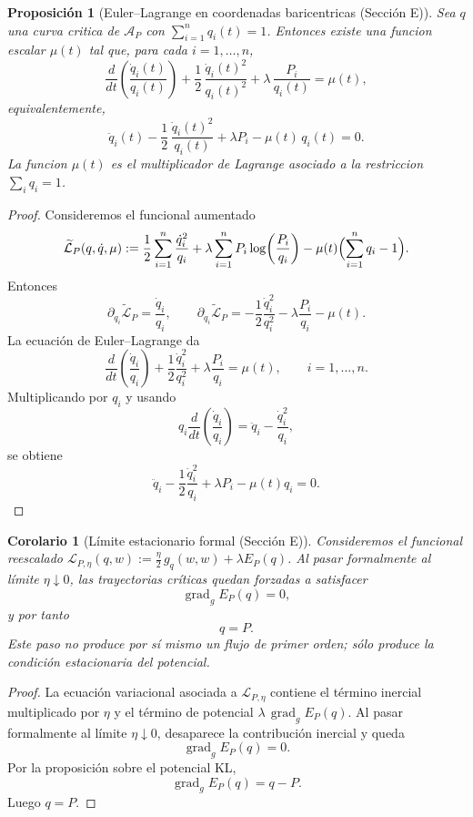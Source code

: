 ﻿\documentclass[12pt]{article}
\newcommand{\fuente}[1]{\textnormal{(#1)}}
\newtheorem{proposicion}{Proposición}[section]
\newtheorem{corolario}{Corolario}[section]
\begin{document}
\begin{proposicion}[Euler--Lagrange en coordenadas baricentricas \fuente{Sección E}]
Sea \(q\) una curva critica de \(\mathcal A_P\) con \(\sum_{i=1}^n q_i(t)=1\). Entonces existe una funcion escalar \(\mu(t)\) tal que, para cada \(i=1,\dots,n\),
\[
\frac{d}{dt}\left(\frac{\dot q_i(t)}{q_i(t)}\right)+\frac12\,\frac{\dot q_i(t)^2}{q_i(t)^2}+\lambda\,\frac{P_i}{q_i(t)}=\mu(t),
\]
equivalentemente,
\[
\ddot q_i(t)-\frac12\,\frac{\dot q_i(t)^2}{q_i(t)}+\lambda P_i-\mu(t)\,q_i(t)=0.
\]
La funcion \(\mu(t)\) es el multiplicador de Lagrange asociado a la restriccion \(\sum_i q_i=1\).
\end{proposicion}
\begin{proof}
Consideremos el funcional aumentado
\[
\widetilde{\mathcal L}_P(q,\dot q,\mu)
:=\frac12\sum_{i=1}^n\frac{\dot q_i^2}{q_i}
+\lambda\sum_{i=1}^n P_i\log\!\left(\frac{P_i}{q_i}\right)
-\mu(t)\Bigl(\sum_{i=1}^n q_i-1\Bigr).
\]
Entonces
\[
\partial_{\dot q_i}\widetilde{\mathcal L}_P=\frac{\dot q_i}{q_i},
\qquad
\partial_{q_i}\widetilde{\mathcal L}_P
=-\frac12\frac{\dot q_i^2}{q_i^2}-\lambda\frac{P_i}{q_i}-\mu(t).
\]
La ecuación de Euler--Lagrange da
\[
\frac{d}{dt}\left(\frac{\dot q_i}{q_i}\right)
+\frac12\frac{\dot q_i^2}{q_i^2}
+\lambda\frac{P_i}{q_i}
=\mu(t),
\qquad i=1,\dots,n.
\]
Multiplicando por \(q_i\) y usando
\[
q_i\frac{d}{dt}\left(\frac{\dot q_i}{q_i}\right)=\ddot q_i-\frac{\dot q_i^2}{q_i},
\]
se obtiene
\[
\ddot q_i-\frac12\frac{\dot q_i^2}{q_i}+\lambda P_i-\mu(t)q_i=0.
\]
\end{proof}

\begin{corolario}[Límite estacionario formal \fuente{Sección E}]
Consideremos el funcional reescalado \(\mathcal L_{P,\eta}(q,w):=\frac{\eta}{2}\,g_q(w,w)+\lambda E_P(q)\). Al pasar formalmente al límite \(\eta\downarrow 0\), las trayectorias críticas quedan forzadas a satisfacer
\[
\operatorname{grad}_g E_P(q)=0,
\]
y por tanto
\[
q=P.
\]
Este paso no produce por sí mismo un flujo de primer orden; sólo produce la condición estacionaria del potencial.
\end{corolario}
\begin{proof}
La ecuación variacional asociada a \(\mathcal L_{P,\eta}\) contiene el término inercial multiplicado por \(\eta\) y el término de potencial \(\lambda\,\operatorname{grad}_gE_P(q)\). Al pasar formalmente al límite \(\eta\downarrow 0\), desaparece la contribución inercial y queda
\[
\operatorname{grad}_gE_P(q)=0.
\]
Por la proposición sobre el potencial KL,
\[
\operatorname{grad}_gE_P(q)=q-P.
\]
Luego \(q=P\).
\end{proof}
\end{document}
